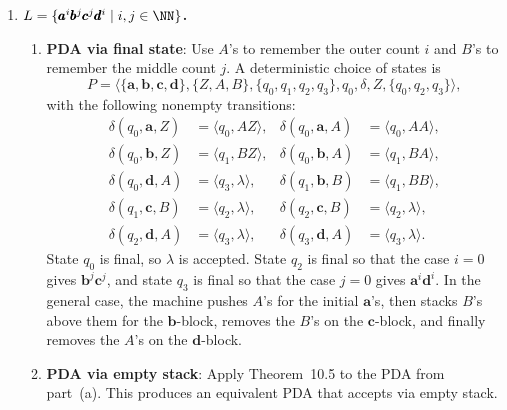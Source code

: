 \begin{enumerate}[{10.}1. ]
\begin{enumerate}
\item \textbf{PDA accepting via final state} (Theorem 10.4): Apply Theorem 10.4 to the machine in part (b). Using fresh bottom markers $U$ and $V$, we obtain
\[
P_f=\langle\Sigma,\Gamma\cup\{U,V\},\{s,f\},s,\delta_f,V,\{f\}\rangle,
\]
where $\delta_f$ agrees with $\delta$ on all old stack symbols, and the additional nonempty transitions are
\[
\delta_f(s,\lambda,V)=\{\langle s,RU\rangle\},\qquad
\delta_f(s,\lambda,U)=\{\langle f,U\rangle\}.
\]
There are no other moves involving $U$ or $V$, and no moves out of $f$. By Theorem 10.4, $L(P_f)=\Lambda(P)$.
\end{enumerate}

\item \textbf{$L=\{\pmb{a}^i\pmb{b}^j\pmb{c}^j\pmb{d}^i \mid i,j\in\NN\}$.}

\begin{enumerate}
\item \textbf{PDA via final state}: Use $A$'s to remember the outer count $i$ and
$B$'s to remember the middle count $j$. A deterministic choice of states is
\[
P=\langle\{\pmb{a},\pmb{b},\pmb{c},\pmb{d}\},\{Z,A,B\},
\{q_0,q_1,q_2,q_3\},q_0,\delta,Z,\{q_0,q_2,q_3\}\rangle,
\]
with the following nonempty transitions:
\begin{align*}
\delta(q_0,\pmb{a},Z)&=\langle q_0,AZ\rangle, &
\delta(q_0,\pmb{a},A)&=\langle q_0,AA\rangle, \\
\delta(q_0,\pmb{b},Z)&=\langle q_1,BZ\rangle, &
\delta(q_0,\pmb{b},A)&=\langle q_1,BA\rangle, \\
\delta(q_0,\pmb{d},A)&=\langle q_3,\lambda\rangle, &
\delta(q_1,\pmb{b},B)&=\langle q_1,BB\rangle, \\
\delta(q_1,\pmb{c},B)&=\langle q_2,\lambda\rangle, &
\delta(q_2,\pmb{c},B)&=\langle q_2,\lambda\rangle, \\
\delta(q_2,\pmb{d},A)&=\langle q_3,\lambda\rangle, &
\delta(q_3,\pmb{d},A)&=\langle q_3,\lambda\rangle.
\end{align*}
State $q_0$ is final, so $\lambda$ is accepted. State $q_2$ is final so that the
case $i=0$ gives $\pmb{b}^j\pmb{c}^j$, and state $q_3$ is final so that the case
$j=0$ gives $\pmb{a}^i\pmb{d}^i$. In the general case, the machine pushes $A$'s
for the initial $\pmb{a}$'s, then stacks $B$'s above them for the
$\pmb{b}$-block, removes the $B$'s on the $\pmb{c}$-block, and finally removes
the $A$'s on the $\pmb{d}$-block.

\item \textbf{PDA via empty stack}: Apply Theorem~10.5 to the PDA from part~(a).
This produces an equivalent PDA that accepts via empty stack.


\end{enumerate}
\end{enumerate}
